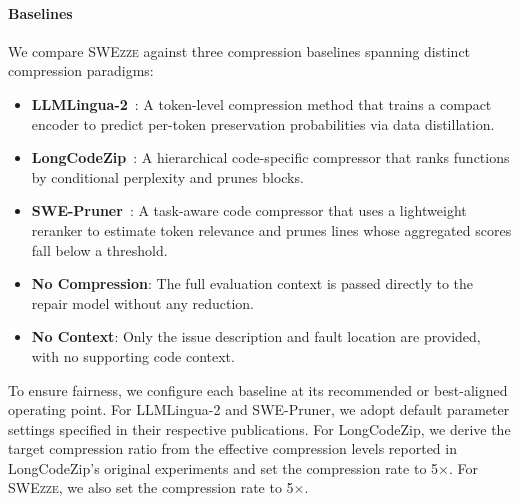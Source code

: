\documentclass[sigconf,nonacm]{acmart}
\newcommand{\haoxiang}[1]{{\color{red}\textbf{(Haoxiang:} #1\textbf{)}}}
\newcommand{\projName}{\textsc{SWEzze}\xspace}
\begin{document}

\paragraph*{Baselines} We compare \projName against three compression baselines spanning distinct compression paradigms:

\begin{itemize}
    \item \textbf{LLMLingua-2}~: A token-level compression method that trains a compact encoder to predict per-token preservation probabilities via data distillation. 
    \item \textbf{LongCodeZip}~: A hierarchical code-specific compressor that ranks functions by conditional perplexity and prunes blocks. 
    \item \textbf{SWE-Pruner}~:  A task-aware code compressor that uses a lightweight reranker to estimate token relevance and prunes lines whose aggregated scores fall below a threshold.
    \item \textbf{No Compression}: The full evaluation context is passed directly to the repair model without any reduction.
    \item \textbf{No Context}: Only the issue description and fault location are provided, with no supporting code context. 
\end{itemize}

To ensure fairness, we configure each baseline at its recommended or best-aligned operating point. For LLMLingua-2 and SWE-Pruner, we adopt default parameter settings specified in their respective publications. For LongCodeZip, we derive the target compression ratio from the effective compression levels reported in LongCodeZip's original experiments and set the compression rate to 5$\times$. For \projName, we also set the compression rate to 5$\times$.


\end{document}
